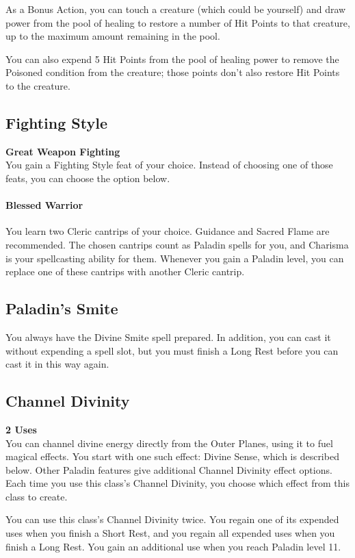 \documentclass[letterpaper,openany,oneside,twocolumn]{book}
\begin{document}
As a Bonus Action, you can touch a creature (which could be yourself) and draw power from the pool of healing to restore a number of Hit Points to that creature, up to the maximum amount remaining in the pool.

You can also expend 5 Hit Points from the pool of healing power to remove the Poisoned condition from the creature; those points don't also restore Hit Points to the creature.
\subsection*{Fighting Style}
\textbf{Great Weapon Fighting}\\
You gain a Fighting Style feat of your choice. Instead of choosing one of those feats, you can choose the option below.

\paragraph*{Blessed Warrior} You learn two Cleric cantrips of your choice. Guidance and Sacred Flame are recommended. The chosen cantrips count as Paladin spells for you, and Charisma is your spellcasting ability for them. Whenever you gain a Paladin level, you can replace one of these cantrips with another Cleric cantrip.
\subsection*{Paladin's Smite}
You always have the Divine Smite spell prepared. In addition, you can cast it without expending a spell slot, but you must finish a Long Rest before you can cast it in this way again.
\subsection*{Channel Divinity}
\textbf{2 Uses}\\
You can channel divine energy directly from the Outer Planes, using it to fuel magical effects. You start with one such effect: Divine Sense, which is described below. Other Paladin features give additional Channel Divinity effect options. Each time you use this class's Channel Divinity, you choose which effect from this class to create.

You can use this class's Channel Divinity twice. You regain one of its expended uses when you finish a Short Rest, and you regain all expended uses when you finish a Long Rest. You gain an additional use when you reach Paladin level 11.
\end{document}
